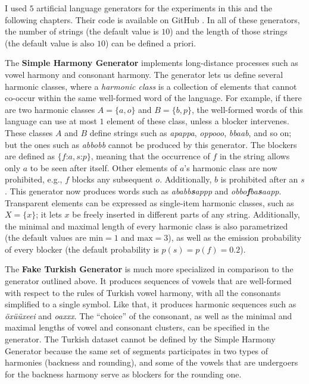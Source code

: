 I used $5$ artificial language generators for the experiments in this and the following chapters. Their code is available on GitHub \href{https://github.com/alenaks/subregular-experiments}{\faGithub} \citep{GHsubex}.
In all of these generators, the number of strings (the default value is $10$) and the length of those strings (the default value is also $10$) can be defined a priori.


The \textbf{Simple Harmony Generator} implements long-distance processes such as vowel harmony and consonant harmony.
The generator lets us define several harmonic classes, where a \emph{harmonic class} is a collection of elements that cannot co-occur within the same well-formed word of the language.
For example, if there are two harmonic classes $A = \{a, o\}$ and $B = \{b, p\}$, the well-formed words of this language can use at most $1$ element of these class, unless a blocker intervenes.
These classes $A$ and $B$ define strings such as \emph{apappa}, \emph{oppooo}, \emph{bbaab}, and so on; but the ones such as \emph{abbobb} cannot be produced by this generator.
The blockers are defined as $\{f$:$a, s$:$p\}$, meaning that the occurrence of $f$ in the string allows only $a$ to be seen after itself.
Other elements of $a$'s harmonic class are now prohibited, e.g., $f$ blocks any subsequent $o$.
Additionally, $b$ is prohibited after an $s$.
This generator now produces words such as \emph{ababb\textbf{s}appp} and \emph{obbo\textbf{f}ba\textbf{s}aapp}.
Transparent elements can be expressed as single-item harmonic classes, such as $X = \{x\}$; it lets $x$ be freely inserted in different parts of any string.
Additionally, the minimal and maximal length of every harmonic class is also parametrized (the default values are $\textrm{min} = 1$ and $\textrm{max} = 3$), as well as the emission probability of every blocker (the default probability is $p(s) = p(f) = 0.2$).


The \textbf{Fake Turkish Generator} is much more specialized in comparison to the generator outlined above.
It produces sequences of vowels that are well-formed with respect to the rules of Turkish vowel harmony, with all the consonants simplified to a single symbol.
Like that, it produces harmonic sequences such as \emph{\"ox\"u\"uxeei} and \emph{oa\textsci xxx\textsci\textsci}.
The ``choice'' of the consonant, as well as the minimal and maximal lengths of vowel and consonant clusters, can be specified in the generator.
The Turkish dataset cannot be defined by the Simple Harmony Generator because the same set of segments participates in two types of harmonies (backness and rounding), and some of the vowels that are undergoers for the backness harmony serve as blockers for the rounding one.



